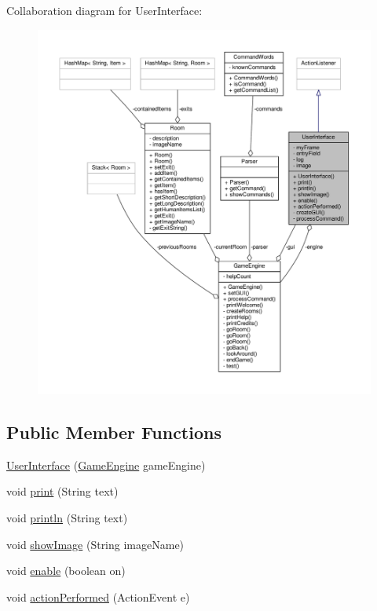 Collaboration diagram for User\-Interface\-:
\nopagebreak
\begin{figure}[H]
\begin{center}
\leavevmode
\includegraphics[width=350pt]{classUserInterface__coll__graph}
\end{center}
\end{figure}
\subsection*{Public Member Functions}
\begin{DoxyCompactItemize}
\item 
\hyperlink{classUserInterface_a3afe416f3ee335fec8bc815d382c3874}{User\-Interface} (\hyperlink{classGameEngine}{Game\-Engine} game\-Engine)
\item 
void \hyperlink{classUserInterface_a7a0de5ce2b0e0d25ba6573e87c63c1de}{print} (String text)
\item 
void \hyperlink{classUserInterface_a79f606b4b1f5d1523e50eea00039ed94}{println} (String text)
\item 
void \hyperlink{classUserInterface_ab793a0f12878c698ba3e1720a9f86f3b}{show\-Image} (String image\-Name)
\item 
void \hyperlink{classUserInterface_ab9e499c6c847d52c8753f08d62f1adfc}{enable} (boolean on)
\item 
void \hyperlink{classUserInterface_a0a1ee40a4dbca4aeee002c3d0537c7d5}{action\-Performed} (Action\-Event e)
\end{DoxyCompactItemize}
